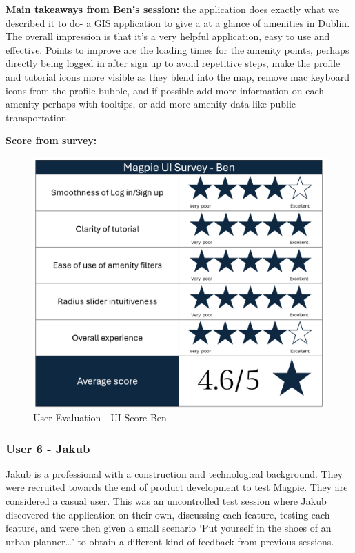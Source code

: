 \noindent\textbf{Main takeaways from Ben's session: }the application does
exactly what we described it to do- a GIS application to give a at a glance of
amenities in Dublin. The overall impression is that it's a very helpful
application, easy to use and effective. Points to improve are the loading times
for the amenity points, perhaps directly being logged in after sign up to avoid
repetitive steps, make the profile and tutorial icons more visible as they blend
into the map, remove mac keyboard icons from the profile bubble, and if possible
add more information on each amenity perhaps with tooltips, or add more amenity
data like public transportation.

\newpage{}

\textbf{Score from survey: }

\begin{figure}[h!]
    \centering
    \includegraphics[width=\textwidth]{images/survey-ben.png}
    \caption{User Evaluation - UI Score Ben}
\end{figure}

\newpage{}

\subsubsection{User 6 - Jakub}
Jakub is a professional with a construction and technological background. They
were recruited towards the end of product development to test Magpie. They are
considered a casual user. This was an uncontrolled test session where Jakub
discovered the application on their own, discussing each feature, testing each
feature, and were then given a small scenario `Put yourself in the shoes of an
urban planner\ldots' to obtain a different kind of feedback from previous
sessions.


